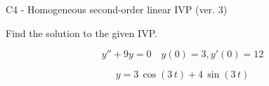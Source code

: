 \begin{exercise}
  \begin{exerciseTitle}C4 - Homogeneous second-order linear IVP (ver. 3)\end{exerciseTitle}
  \begin{exerciseStatement}
    
Find the solution to the given IVP.

    
\[y''+9y = 0 \hspace{1em} y(0) = 3 , y'(0) = 12\]

  \end{exerciseStatement}
  \begin{exerciseAnswer}
    
\[y= 3 \, \cos\left(3 \, t\right) + 4 \, \sin\left(3 \, t\right)\]

  \end{exerciseAnswer}
\end{exercise}